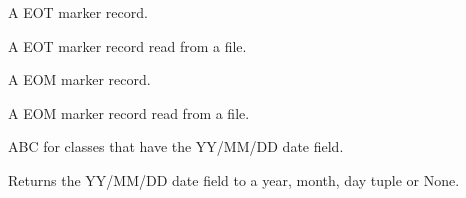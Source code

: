 \documentclass[letterpaper,10pt,english]{sphinxmanual}
\begin{document}

\begin{fulllineitems}
\label{\detokenize{ref/LIS/core/LogiRec:TotalDepth.LIS.core.LogiRec.LrEOT}}
A EOT marker record.

\end{fulllineitems}


\begin{fulllineitems}
\label{\detokenize{ref/LIS/core/LogiRec:TotalDepth.LIS.core.LogiRec.LrEOTRead}}
A EOT marker record read from a file.

\end{fulllineitems}


\begin{fulllineitems}
\label{\detokenize{ref/LIS/core/LogiRec:TotalDepth.LIS.core.LogiRec.LrEOM}}
A EOM marker record.

\end{fulllineitems}


\begin{fulllineitems}
\label{\detokenize{ref/LIS/core/LogiRec:TotalDepth.LIS.core.LogiRec.LrEOMRead}}
A EOM marker record read from a file.

\end{fulllineitems}


\begin{fulllineitems}
\label{\detokenize{ref/LIS/core/LogiRec:TotalDepth.LIS.core.LogiRec.LrWithDateField}}
ABC for classes that have the YY/MM/DD date field.

\begin{fulllineitems}
\label{\detokenize{ref/LIS/core/LogiRec:TotalDepth.LIS.core.LogiRec.LrWithDateField.ymd}}
Returns the YY/MM/DD date field to a year, month, day tuple or None.

\end{fulllineitems}


\end{fulllineitems}
\end{document}
